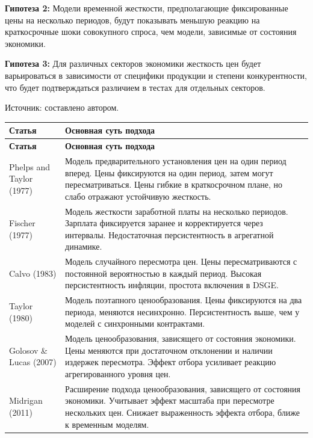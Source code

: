 \textbf{Гипотеза 2:} Модели временной жесткости, предполагающие фиксированные цены на несколько периодов, будут показывать меньшую реакцию на краткосрочные шоки совокупного спроса, чем модели, зависимые от состояния экономики.

\textbf{Гипотеза 3:} Для различных секторов экономики жесткость цен будет варьироваться в зависимости от специфики продукции и степени конкурентности, что будет подтверждаться различием в тестах для отдельных секторов.



\begin{center}
	\begin{ThreePartTable}
		\begin{TableNotes}
			\item Источник: составлено автором.
		\end{TableNotes}
		\begin{tabularx}{\textwidth}{|p{2.7cm}|X|}
			\caption{Обзор классических моделей жесткости цен}
			\label{tab:classic_rigidity_models} \\ 
			\hline
			\textbf{Статья} & \textbf{Основная суть подхода} \\ 
			\hline
			\endfirsthead
			
			\hline
			\textbf{Статья} & \textbf{Основная суть подхода} \\ 
			\hline
			\endhead
			
			\hline
			\insertTableNotes
			\endlastfoot
			
			Phelps and Taylor (1977) & Модель предварительного установления цен на один период вперед. Цены фиксируются на один период, затем могут пересматриваться. Цены гибкие в краткосрочном плане, но слабо отражают устойчивую жесткость. \\ 
			\hline
			Fischer (1977) & Модель жесткости заработной платы на несколько периодов. Зарплата фиксируется заранее и корректируется через интервалы. Недостаточная персистентность в агрегатной динамике. \\
			\hline
			Calvo (1983) & Модель случайного пересмотра цен. Цены пересматриваются с постоянной вероятностью в каждый период. Высокая персистентность инфляции, простота включения в DSGE. \\
			\hline
			Taylor (1980) & Модель поэтапного ценообразования. Цены фиксируются на два периода, меняются несинхронно. Персистентность выше, чем у моделей с синхронными контрактами. \\
			\hline
			Golosov \& Lucas (2007) & Модель ценообразования, зависящего от состояния экономики. Цены меняются при достаточном отклонении и наличии издержек пересмотра. Эффект отбора усиливает реакцию агрегированного уровня цен. \\
			\hline
			Midrigan (2011) & Расширение подхода ценообразования, зависящего от состояния экономики. Учитывает эффект масштаба при пересмотре нескольких цен. Снижает выраженность эффекта отбора, ближе к временным моделям. \\
			\hline
		\end{tabularx}
	\end{ThreePartTable}
\end{center}






